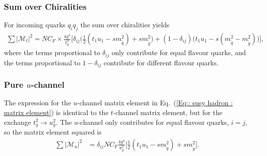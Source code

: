 \documentclass[twoside,english]{uiofysmaster}
\begin{document}
{\subsubsection{Sum over Chiralities}

For incoming quarks $q_iq_j$ the sum over chiralities  yields
\begin{align*}
\sum |\mathcal{M}_t|^2 =  NC_F  \times\frac{4 g^4}{t_g^2} \Big[\delta_{ij} \big(\frac{1}{2}(t_1u_1 -sm_{\widetilde{q}}^2)+  sm_{\widetilde{g}}^2 \big) + (1-\delta_{ij})\big(t_1u_1 -s(m_{\widetilde{q}}^2- m_{\widetilde{g}}^2) \big)\Big],
\end{align*}
where the terms proportional to $\delta_{ij}$ only contribute for equal flavour quarks, and the terms proportional to $1 - \delta_{ij}$ contribute for different flavour quarks.

\subsubsection{Pure $u$-channel}

The expression for the $u$-channel matrix element in Eq.~(\ref{Eq:: susy hadron : matrix element}) is identical to the $t$-channel matrix element, but for the exchange $t_g^2 \rightarrow u_g^2$. The $u$-channel only contributes for equal flavour quarks, $i =j$, so the matrix element squared is
\begin{align*}
\sum |\mathcal{M}_u|^2 &= \delta_{ij} NC_F \frac{4g^4}{u_g^2} \Big[ \frac{1}{2}(t_1u_1-sm_{\widetilde{q}}^2) + sm_{\widetilde{g}}^2 \Big]. 
\end{align*}


}
\end{document}
